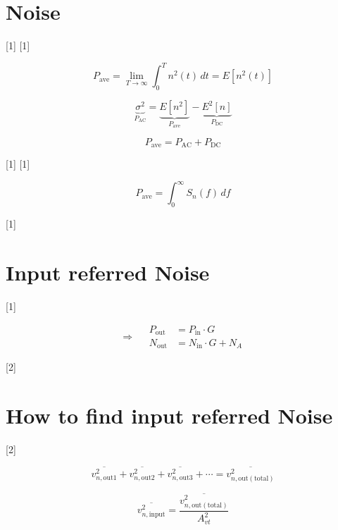 \documentclass[11pt,a4paper]{article}
\begin{document}

\section{Noise}

[1]
[1]

\[ P_{\mathrm{ave}} = \lim_{T\to\infty} \int_0^T n^2(t)\,dt = E\left[n^2(t)\right] \]

\[ \underbrace{\sigma^2}_{P_{\mathrm{AC}}} = \underbrace{E\left[n^2\right]}_{P_{\mathrm{ave}}} - \underbrace{E^2\left[n\right]}_{P_{\mathrm{DC}}} \]

\[ P_{\mathrm{ave}} = P_{\mathrm{AC}} + P_{\mathrm{DC}} \]

[1]
[1]

\[ P_{\mathrm{ave}} = \int_0^\infty S_n(f)\,df \]

[1]

\section{Input referred Noise}

[1]

\[ \Rightarrow\quad \begin{aligned} P_{\mathrm{out}} &= P_{\mathrm{in}}\cdot G \\ N_{\mathrm{out}} &= N_{\mathrm{in}}\cdot G + N_A \end{aligned} \]

[2]

\section{How to find input referred Noise}

\begin{ornek}
[2]
\end{ornek}

\[ \overline{v_{n,\mathrm{out}1}^2} + \overline{v_{n,\mathrm{out}2}^2} + \overline{v_{n,\mathrm{out}3}^2} + \cdots = \overline{v_{n,\mathrm{out(total)}}^2} \]

\[ \overline{v_{n,\mathrm{input}}^2} = \frac{\overline{v_{n,\mathrm{out(total)}}^2}}{A_{vt}^2} \]
\end{document}
